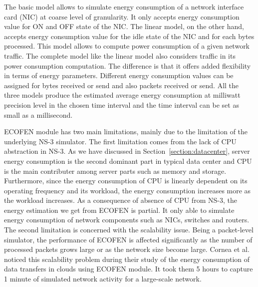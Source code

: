 The basic model allows to simulate energy consumption of a network interface card (NIC) at coarse level of granularity. It only accepts energy consumption value for ON and OFF state of the NIC. The linear model, on the other hand, accepts energy consumption value for the idle state of the NIC and for each bytes processed. This model allows to compute power consumption of a given network traffic. The complete model like the linear model also considers traffic in its power consumption computation. The difference is that it offers added flexibility in terms of energy parameters. Different energy consumption values can be assigned for bytes received or send and also packets received or send. All the three models produce the estimated average energy consumption at milliwatt precision level in the chosen time interval and the time interval can be set as small as a millisecond. 

ECOFEN module has two main limitations, mainly due to the limitation of the underlying NS-3 simulator. The first limitation comes from the lack of CPU abstraction in NS-3. As we have discussed in Section~\ref{section:datacenter}, server energy consumption is the second dominant part in typical data center and CPU is the main contributer among server parts such as memory and storage. Furthermore, since the energy consumption of CPU is linearly dependent on its operating frequency and its workload, the energy consumption increases more as the workload increases. As a consequence of absence of CPU from NS-3, the energy estimation we get from ECOFEN is partial. It only able to simulate energy consumption of network components such as NICs, switches and routers. The second limitation is concerned with the scalability issue. Being a packet-level simulator, the performance of ECOFEN is affected significantly as the number of processed packets grows large or as the network size become large. Cornea et al.~\cite{DBLP:conf/cloudnet/CorneaOL14} noticed this scalability problem during their study of the energy consumption of data transfers in clouds using ECOFEN module. It took them 5 hours to capture 1 minute of simulated network activity for a large-scale network. 

